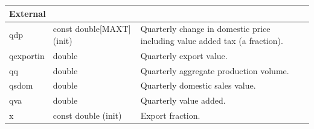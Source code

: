\documentclass{article}
\begin{document}
\begin{longtable}{p{}p{}p{}}
\multicolumn{3}{l}{\textbf{External}} \\
\midrule
qdp & const double[MAXT] (init) & Quarterly change in domestic price including value added tax (a fraction).\\
qexportin & double & Quarterly export value.\\
qq & double & Quarterly aggregate production volume.\\
qsdom & double & Quarterly domestic sales value.\\
qva & double & Quarterly value added.\\
x & const double (init) & Export fraction.\\
\bottomrule
\end{longtable}
\end{document}
